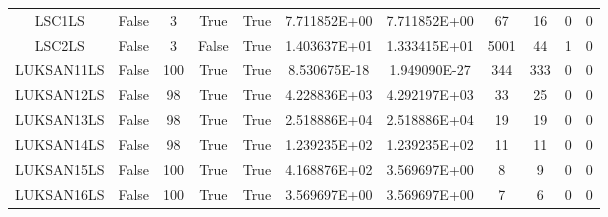 \begin{longtable}{ccccccccccc}
	\cellcolor{default2} LSC1LS& \cellcolor{default2} False& \cellcolor{default2} 3& \cellcolor{default2} True& \cellcolor{default2} True& \cellcolor{ok} 7.711852E+00& \cellcolor{best} 7.711852E+00& \cellcolor{poor} 67& \cellcolor{best} 16& \cellcolor{default2} 0& \cellcolor{default2} 0\\
	\cellcolor{default1} LSC2LS& \cellcolor{default1} False& \cellcolor{default1} 3& \cellcolor{default1} False& \cellcolor{default1} True& \cellcolor{poor} 1.403637E+01& \cellcolor{best} 1.333415E+01& \cellcolor{poor} 5001& \cellcolor{best} 44& \cellcolor{default1} 1& \cellcolor{default1} 0\\
	\cellcolor{default2} LUKSAN11LS& \cellcolor{default2} False& \cellcolor{default2} 100& \cellcolor{default2} True& \cellcolor{default2} True& \cellcolor{ok} 8.530675E-18& \cellcolor{best} 1.949090E-27& \cellcolor{ok} 344& \cellcolor{best} 333& \cellcolor{default2} 0& \cellcolor{default2} 0\\
	\cellcolor{default1} LUKSAN12LS& \cellcolor{default1} False& \cellcolor{default1} 98& \cellcolor{default1} True& \cellcolor{default1} True& \cellcolor{best} 4.228836E+03& \cellcolor{poor} 4.292197E+03& \cellcolor{ok} 33& \cellcolor{best} 25& \cellcolor{default1} 0& \cellcolor{default1} 0\\
	\cellcolor{default2} LUKSAN13LS& \cellcolor{default2} False& \cellcolor{default2} 98& \cellcolor{default2} True& \cellcolor{default2} True& \cellcolor{best} 2.518886E+04& \cellcolor{ok} 2.518886E+04& \cellcolor{best} 19& \cellcolor{best} 19& \cellcolor{default2} 0& \cellcolor{default2} 0\\
	\cellcolor{default1} LUKSAN14LS& \cellcolor{default1} False& \cellcolor{default1} 98& \cellcolor{default1} True& \cellcolor{default1} True& \cellcolor{ok} 1.239235E+02& \cellcolor{best} 1.239235E+02& \cellcolor{best} 11& \cellcolor{best} 11& \cellcolor{default1} 0& \cellcolor{default1} 0\\
	\cellcolor{default2} LUKSAN15LS& \cellcolor{default2} False& \cellcolor{default2} 100& \cellcolor{default2} True& \cellcolor{default2} True& \cellcolor{poor} 4.168876E+02& \cellcolor{best} 3.569697E+00& \cellcolor{best} 8& \cellcolor{ok} 9& \cellcolor{default2} 0& \cellcolor{default2} 0\\
	\cellcolor{default1} LUKSAN16LS& \cellcolor{default1} False& \cellcolor{default1} 100& \cellcolor{default1} True& \cellcolor{default1} True& \cellcolor{best} 3.569697E+00& \cellcolor{ok} 3.569697E+00& \cellcolor{ok} 7& \cellcolor{best} 6& \cellcolor{default1} 0& \cellcolor{default1} 0\\

\end{longtable}
